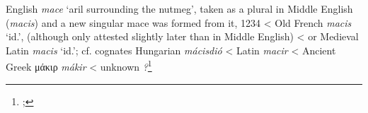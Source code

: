 \begin{etymology}\label{ety:mace}
English \textit{mace} `aril surrounding the nutmeg', taken as a plural in Middle English (\textit{macis}) and a new singular mace was formed from it, 1234
< Old French \textit{macis} `id.', (although only attested slightly later than in Middle English)
< or Medieval Latin \textit{macis} `id.'; cf. cognates Hungarian \textit{mácisdió}
< Latin \textit{macir}
< Ancient Greek {μάκιρ} \textit{mákir}
< unknown \textit{?}\footnote{; }
\end{etymology}